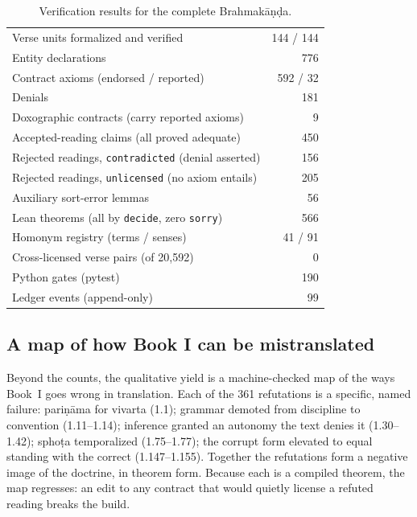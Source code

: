 \documentclass[11pt]{article}
\begin{document}
\begin{table}[t]
\centering
\caption{Verification results for the complete Brahmak\={a}\d{n}\d{d}a.}
\label{tab:results}
\begin{tabular}{lr}
\toprule
Verse units formalized and verified & 144 / 144 \\
Entity declarations                & 776 \\
Contract axioms (endorsed / reported) & 592 / 32 \\
Denials                            & 181 \\
Doxographic contracts (carry reported axioms) & 9 \\
Accepted-reading claims (all proved adequate) & 450 \\
Rejected readings, \texttt{contradicted} (denial asserted) & 156 \\
Rejected readings, \texttt{unlicensed} (no axiom entails)  & 205 \\
Auxiliary sort-error lemmas        & 56 \\
Lean theorems (all by \texttt{decide}, zero \texttt{sorry}) & 566 \\
Homonym registry (terms / senses)  & 41 / 91 \\
Cross-licensed verse pairs (of 20{,}592) & 0 \\
Python gates (pytest)              & 190 \\
Ledger events (append-only)        & 99 \\
\bottomrule
\end{tabular}
\end{table}

\subsection{A map of how Book I can be mistranslated}
Beyond the counts, the qualitative yield is a machine-checked map of the
ways Book~I goes wrong in translation. Each of the 361 refutations is a
specific, named failure: pari\d{n}\={a}ma for vivarta (1.1); grammar demoted
from discipline to convention (1.11--1.14); inference granted an autonomy
the text denies it (1.30--1.42); spho\d{t}a temporalized (1.75--1.77); the
corrupt form elevated to equal standing with the correct (1.147--1.155).
Together the refutations form a negative image of the doctrine, in theorem
form. Because each is a compiled theorem, the map regresses: an edit to any
contract that would quietly license a refuted reading breaks the build.
\end{document}
